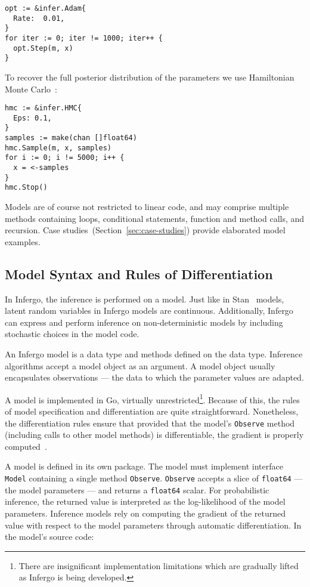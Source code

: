 \documentclass[sigplan,review,10pt,anonymous]{acmart}
\begin{document}
\begin{sloppypar}
\begin{lstlisting}
opt := &infer.Adam{
  Rate:  0.01,
}
for iter := 0; iter != 1000; iter++ {
  opt.Step(m, x)
}
\end{lstlisting}

To recover the full posterior distribution of
the parameters we use Hamiltonian Monte Carlo~\cite{N12}:

\begin{lstlisting}
hmc := &infer.HMC{
  Eps: 0.1,
}
samples := make(chan []float64)
hmc.Sample(m, x, samples)
for i := 0; i != 5000; i++ {
  x = <-samples
}
hmc.Stop()
\end{lstlisting}

Models are of course not restricted to linear code, and may
comprise multiple methods containing loops, conditional
statements, function and method calls, and recursion. Case
studies~(Section~\ref{sec:case-studies}) provide elaborated
model examples.

\subsection{Model Syntax and Rules of Differentiation}

In Infergo, the inference is performed on a model. Just like in
Stan~\cite{Stan17} models, latent random variables in Infergo
models are continuous. Additionally, Infergo can express and
perform inference on non-deterministic models by including
stochastic choices in the model code.

An Infergo model is a data type and methods defined on the data
type.  Inference algorithms accept a model object as an
argument.  A model object usually encapsulates observations ---
the data to which the parameter values are adapted.

A model is implemented in Go, virtually
unrestricted\footnote{There are insignificant implementation
limitations which are gradually lifted as Infergo is being
developed.}. Because of this, the rules of model specification
and differentiation are quite straightforward. Nonetheless, the
differentiation rules ensure that provided that the model's
\lstinline{Observe} method (including calls to other model methods)
is differentiable, the gradient is properly computed~\cite{GW08}.

A model is defined in its own package. The model must
implement interface \lstinline{Model} containing a single method
\lstinline{Observe}. \lstinline{Observe} accepts a slice of
\lstinline{float64} --- the model parameters --- and returns a
\lstinline{float64} scalar. For probabilistic inference, the
returned value is interpreted as the log-likelihood of the model
parameters. Inference models rely on computing the gradient of
the returned value with respect to the model parameters through
automatic differentiation. In the model's source code:


\end{sloppypar}
\end{document}
